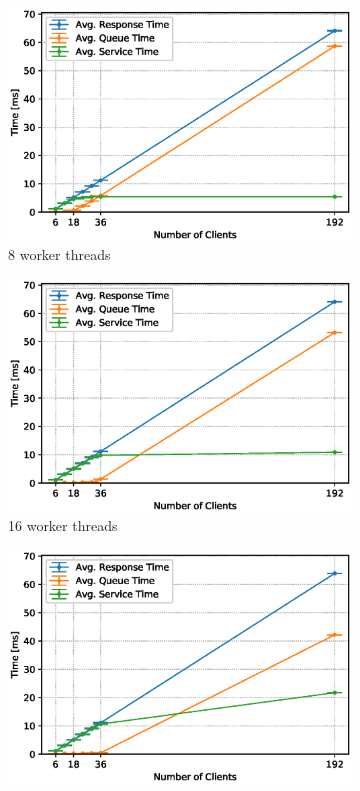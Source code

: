 \documentclass[11pt,a4paper]{article}
\begin{document}
\begin{figure}
    \begin{subfigure}{.5\textwidth}
        \includegraphics[width=1\linewidth]{plots/3_2a_extendedLatencyMiddleware_8w.eps}
        \caption{8 worker threads}
    \end{subfigure}
    \begin{subfigure}{.5\textwidth}
        \includegraphics[width=1\linewidth]{plots/3_2a_extendedLatencyMiddleware_16w.eps}
        \caption{16 worker threads}
    \end{subfigure}
    \begin{subfigure}{.5\textwidth}
        \includegraphics[width=1\linewidth]{plots/3_2a_extendedLatencyMiddleware_32w.eps}

\end{subfigure}
\end{figure}
\end{document}

